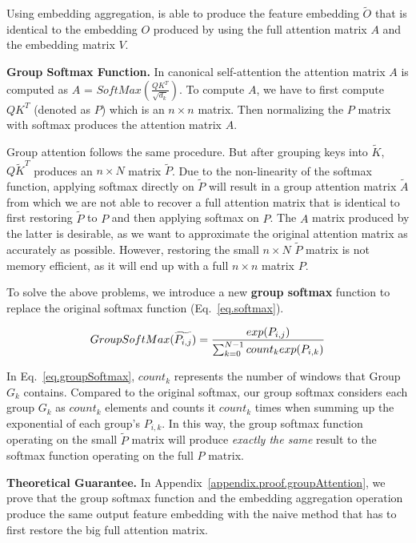 \begin{sloppypar}
Using embedding aggregation, \system is able to produce the feature embedding $\widetilde{O}$ that is identical to the embedding $O$ produced by using the full attention matrix $A$ and the embedding matrix $V$.

\noindent\textbf{Group Softmax Function.}
In canonical self-attention the attention matrix $A$ is computed as $A$ = $\mathit{SoftMax(\frac{QK^T}{\sqrt{d_k}})}$. To compute $A$, we have to first compute $QK^T$ (denoted as $P$) which is an $n \times n$ matrix. Then normalizing the $P$ matrix with softmax produces the attention matrix $A$. 

Group attention follows the same procedure. But after grouping keys into $\widetilde{K}$, $Q\widetilde{K}^T$ produces an $n \times N$ matrix $\widetilde{P}$. Due to the non-linearity of the softmax function, applying softmax directly on $\widetilde{P}$ will result in a group attention matrix $\widetilde{A}$ from which we are not able to recover a full attention matrix that is identical to first restoring $\widetilde{P}$ to $P$ and then applying softmax on $P$. The $A$ matrix produced by the latter is desirable, as we want to approximate the original attention matrix as accurately as possible. 
However, restoring the small $n \times N$ $\widetilde{P}$ matrix is not memory efficient, as it will end up with a full $n \times n$ matrix $P$. %

To solve the above problems, we introduce a new \textbf{group softmax} function to replace the original softmax function (Eq.~\ref{eq.softmax}).

\vspace{-2mm}
\begin{equation}
\label{eq.groupSoftmax}
GroupSoftMax(\widetilde{P_{i,j}}) = \frac{exp(P_{i,j})}{\sum_{k=0}^{N-1} count_k exp(P_{i,k})}\\
\end{equation}

In Eq.~\ref{eq.groupSoftmax}, $count_k$ represents the number of windows that Group $G_k$ contains. Compared to the original softmax, our group softmax considers each group $G_k$ as $count_k$ elements and counts it $count_k$ times when summing up the exponential of each group's $P_{i,k}$.
In this way, the group softmax function operating on the small $\widetilde{P}$ matrix will produce {\it exactly the same} result to the softmax function operating on the full $P$ matrix.

\noindent\textbf{Theoretical Guarantee.} In Appendix~\ref{appendix.proof.groupAttention}, we prove that the group softmax function and the embedding aggregation operation produce the same output feature embedding with the naive method that has to first restore the big full attention matrix.


\end{sloppypar}
